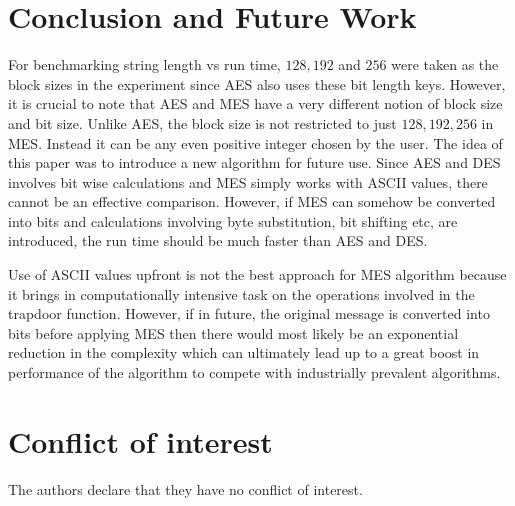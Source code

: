 \section{Conclusion and Future Work}
\label{section: 11}
For benchmarking string length vs run time, $128,192$ and $256$ were taken as the block sizes in the experiment since AES also uses these bit length keys. However, it is crucial to note that AES and MES have a very different notion of block size and bit size. Unlike AES, the block size is not restricted to just $128,192,256$ in MES. Instead it can be any even positive integer chosen by the user. The idea of this paper was to introduce a new algorithm for future use. Since AES and DES involves bit wise calculations and MES simply works with ASCII values, there cannot be an effective comparison. However, if MES can somehow be converted into bits \cite{527526,chen2011efficient} and calculations involving byte substitution, bit shifting etc, are introduced, the run time should be much faster than AES and DES.

Use of ASCII values upfront is not the best approach for MES algorithm because it brings in computationally intensive task on the operations involved in the trapdoor function. However, if in future, the original message is converted into bits before applying MES then there would most likely be an exponential reduction in the complexity which can ultimately lead up to a great boost in performance of the algorithm to compete with industrially prevalent algorithms.



\section*{Conflict of interest}
The authors declare that they have no conflict of interest.





